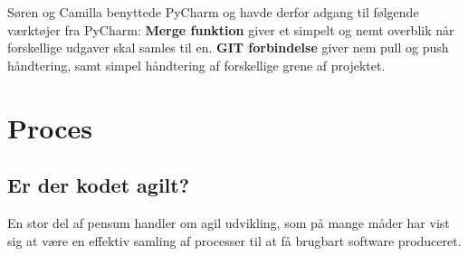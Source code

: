 \documentclass[]{article}
\begin{document}
Søren og Camilla benyttede PyCharm og havde derfor adgang til følgende værktøjer fra PyCharm:
\textbf{Merge funktion} giver et simpelt og nemt overblik når forskellige udgaver skal samles til en. \textbf{GIT forbindelse} giver nem pull og push håndtering, samt simpel håndtering af forskellige grene af projektet.

\pagebreak[3]


\section{Proces} \label{Proces} %

\subsection{Er der kodet agilt?}

En stor del af pensum handler om agil udvikling, som på mange måder har vist sig at være en effektiv samling af processer til at få brugbart software produceret.
\end{document}
